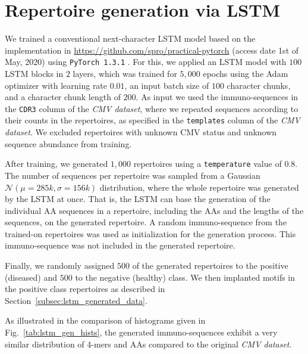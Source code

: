 \documentclass[oneside]{book}
\begin{document}
\section{Repertoire generation via LSTM}
\label{appsec:lstm}
We trained a conventional next-character LSTM model \citep{graves2013generating} based on the implementation in \url{https://github.com/spro/practical-pytorch} (access date 1st of May, 2020) using \texttt{PyTorch 1.3.1} \citep{paszke2019pytorch}.
For this, we applied an LSTM model with $100$ LSTM blocks in $2$ layers,
which was trained for $5,000$ epochs using the Adam optimizer \citep{kingma2014adam}
with learning rate $0.01$,
an input batch size of $100$ character chunks,
and a character chunk length of $200$.
As input we used the immuno-sequences in the \texttt{CDR3} column of the \emph{CMV dataset},
where we repeated sequences according to their counts in the repertoires,
as specified in the \texttt{templates} column of the \emph{CMV dataset}.
We excluded repertoires with unknown CMV status and unknown sequence abundance from training.

After training,
we generated $1,000$ repertoires using a \texttt{temperature} value of $0.8$.
The number of sequences per repertoire was sampled from 
a Gaussian $\mathcal N(\mu=285k, \sigma=156k)$ distribution,
where the whole repertoire was generated by the LSTM at once.
That is,
the LSTM can base the generation of the individual AA sequences in a repertoire,
including the AAs and the lengths of the sequences,
on the generated repertoire.
A random immuno-sequence from the trained-on repertoires was used as initialization for the generation process.
This immuno-sequence was not included in the generated repertoire.

Finally, we randomly assigned $500$ of the generated repertoires to the positive (diseased) and $500$ to the negative (healthy) class.
We then implanted motifs in the positive class repertoires
as described in Section~\ref{subsec:lstm_generated_data}.

As illustrated in the comparison of histograms given in Fig.~\ref{tab:lstm_gen_hists},
the generated immuno-sequences exhibit a very similar distribution of 4-mers and AAs
compared to the original \emph{CMV dataset}.
\end{document}
